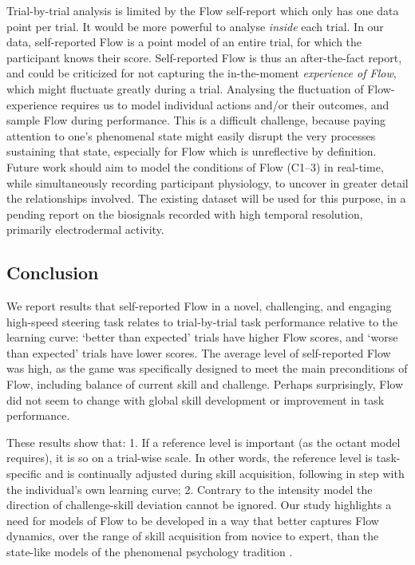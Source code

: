 \documentclass{frontierstyle/frontiersSCNS}
\newcommand{\hl}{\textcolor{red!80}}
\begin{document}
Trial-by-trial analysis is limited by the Flow self-report which only has one data point per trial. It would be more powerful to analyse {\it inside} each trial. In our data, self-reported Flow is a point model of an entire trial, for which the participant knows their score. Self-reported Flow is thus an after-the-fact report, and could be criticized for not capturing the in-the-moment {\it experience of Flow}, which might fluctuate greatly during a trial. Analysing the fluctuation of Flow-experience requires us to model individual actions and/or their outcomes, and sample Flow during performance. This is a difficult challenge, because paying attention to one's phenomenal state might easily disrupt the very processes sustaining that state, especially for Flow which is unreflective by definition. Future work should aim to model the conditions of Flow ({\sf C1--3}) in real-time, while simultaneously recording participant physiology, to uncover in greater detail the relationships involved. The existing dataset will be used for this purpose, in a pending report on the biosignals recorded with high temporal resolution, primarily electrodermal activity.


\subsection{Conclusion}

We report results that self-reported Flow in a novel, challenging, and engaging high-speed steering task relates to trial-by-trial task performance relative to the learning curve: `better than expected' trials have higher Flow scores, and `worse than expected' trials have lower scores. The average level of self-reported Flow was high, as the game was specifically designed to meet the main preconditions of Flow, including balance of current skill and challenge. Perhaps surprisingly, Flow did not seem to change with global skill development or improvement in task performance.

\hl{These results show that: 1. If a reference level is important (as the octant model requires), it is so on a trial-wise scale. In other words, the reference level is task-specific and is continually adjusted during skill acquisition, following in step with the individual's own learning curve; 2. Contrary to the intensity model \citep{Keller2012} the direction of challenge-skill deviation cannot be ignored. Our study highlights a need for models of Flow to be developed in a way that better captures Flow dynamics, over the range of skill acquisition from novice to expert, than the state-like models of the phenomenal psychology tradition \citep{Moneta2012}.}
\end{document}
